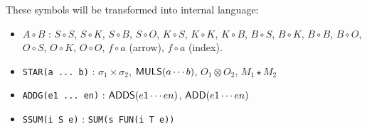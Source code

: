 \documentclass[runningheads]{llncs}
\begin{document}
These symbols will be transformed into internal language:
\begin{itemize}
    \item $A \circ B$ : $S \circ S$, $S \circ K$, $S \circ B$, $S \circ O$, $K \circ S$, $K \circ K$, $K \circ B$, $B \circ S$, $B \circ K$, $B \circ B$, $B \circ O$, $O \circ S$, $O \circ K$, $O \circ O$, $f\circ a$ (arrow), $f\circ a$ (index).
    \item \texttt{STAR(a ... b)} :  $\sigma_1 \times \sigma_2$, $\mathsf{MULS}(a \cdots b)$, $O_1 \otimes O_2$, $ M_1 \star M_2$
    \item \texttt{ADDG(e1 ... en)} : $\mathsf{ADDS}(e1 \cdots en)$, $\mathsf{ADD}(e1 \cdots en)$
    \item \texttt{SSUM(i S e)} : \texttt{SUM(s FUN(i T e))}
\end{itemize}

    
    


%
%
%


%

\appendix

\end{document}
